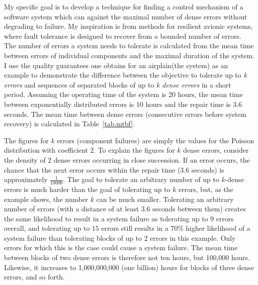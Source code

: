 My specific goal is to develop a technique for finding a control mechanism of a software system which can against the maximal number of dense errors without degrading to failure.
My inspiration is from methods for resilient avionic systems\cite{conf/ftrtft/1992}, where fault tolerance is designed to recover from a bounded number of errors.
The number of errors a system needs to tolerate is calculated from the mean time between errors of individual components and the maximal duration of the system.
I use the quality guarantees one obtains for an airplain(the system) as an example to demonstrate the difference between the objective to tolerate up to {\it k errors} and sequences of separated blocks of up to {\it k dense errors} in a short period.
Assuming the operating time of the system is 20 hours, the mean time between exponentially distributed errors is 10 hours and the repair time is 3.6 seconds.
The mean time between dense errors (consecutive errors before system recovery) is calculated in Table~\ref{tab.mtbf}.

\begin{table*}
\begin{center}
\end{center}
\caption{Probabilities of $k$ dense errors} 
\label{tab.ntbe} 
\end{table*}
%
%

The figures for $k$ errors (component failures) are simply the values for the Poisson distribution with coefficient $2$.
To explain the figures for $k$ dense errors, consider the density of 2 dense errors occurring in close succession.
If an error occurs, the chance that the next error occurs within the repair time (3.6 seconds) is approximately $\frac{1}{10000}$.
The goal to tolerate an arbitrary number of up to $k$-dense errors is much harder than the goal of tolerating up to $k$ errors, but, as the example shows, the number $k$ can be much smaller.   
Tolerating an arbitrary number of errors (with a distance of at least $3.6$ seconds between them) creates the same likelihood to result in a system failure as tolerating up to $9$ errors overall, and tolerating up to $15$ errors still results in a $70\%$ higher likelihood of a system failure than tolerating blocks of up to $2$ errors in this example. 
Only errors for which this is the case could cause a system failure.
The mean time between blocks of two dense errors is therefore not ten hours, but 100,000 hours.
Likewise, it increases to 1,000,000,000 (one billion) hours for blocks of three dense errors, and so forth.


